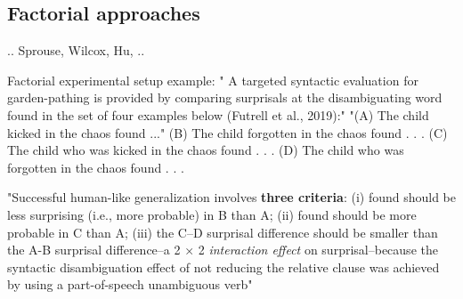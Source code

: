 

\subsection{Factorial approaches}
..
Sprouse, Wilcox, Hu, ..


Factorial experimental setup example:
" A targeted syntactic evaluation for garden-pathing is provided by comparing surprisals at the disambiguating word found in the set of four examples below (Futrell et al., 2019):"\citep{hu2020systematic}
"(A) The child kicked in the chaos found ..."
(B) The child forgotten in the chaos found . . .
(C) The child who was kicked in the chaos found . . .
(D) The child who was forgotten in the chaos found . . .

"Successful human-like generalization involves \textbf{three criteria}: 
(i) found should be less surprising
(i.e., more probable) in B than A; 
(ii) found should be more probable in C than A; 
(iii) the C–D surprisal difference should be smaller than the A-B surprisal difference--a 2 × 2 \textit{interaction effect} on surprisal--because the syntactic disambiguation effect of not reducing the relative clause was achieved by using a part-of-speech unambiguous verb"\citep{hu2020systematic}

